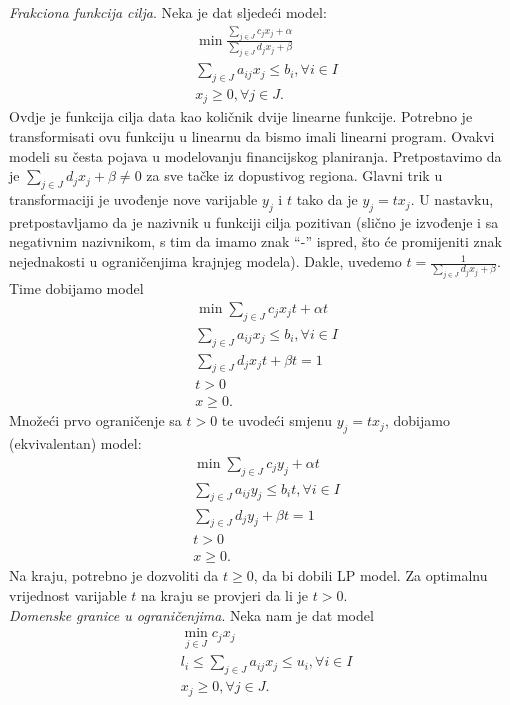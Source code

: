 \documentclass[a4paper, utf8, 11pt, colorlinks]{book}
\begin{document}
\emph{Frakciona funkcija cilja}. Neka je dat sljedeći model:
\begin{align*}
	& \min \frac{\sum_{j \in J} c_j x_j + \alpha}{ \sum_{j \in J} d_j x_j + \beta} \\
	& \sum_{j \in J} a_{ij} x_j \leq b_i,  \forall i \in I \\
	& x_j \geq 0, \forall j \in J.
\end{align*}
Ovdje je funkcija cilja data kao količnik dvije linearne funkcije. Potrebno je transformisati ovu funkciju u linearnu da bismo imali linearni program. Ovakvi modeli su česta pojava u modelovanju financijskog planiranja. Pretpostavimo da je $\sum_{j \in J}d_j x_j + \beta \neq 0$ za sve tačke iz dopustivog regiona. Glavni trik u transformaciji je uvođenje nove varijable $y_j$ i $t$ tako da je $y_j = t x_j$. U nastavku, pretpostavljamo da je nazivnik u funkciji cilja pozitivan (slično je izvođenje i sa negativnim nazivnikom, s tim da imamo znak ``-'' ispred, što će promijeniti znak nejednakosti u ograničenjima krajnjeg modela). Dakle, uvedemo $t = \frac{1}{\sum_{j \in J} d_j x_j + \beta }$. Time dobijamo model
\begin{align*}
	&\min \sum_{j \in J} c_j x_j t + \alpha t \\
	&\sum_{j \in J} a_{ij} x_j \leq b_i,  \forall i \in I \\
	& \sum_{j \in J} d_j x_j t + \beta t = 1 \\
	& t > 0 \\
	& x \geq 0.
\end{align*}
Množeći prvo ograničenje sa $t>0$ te uvodeći smjenu $y_j = t x_j$, dobijamo (ekvivalentan)  model:
\begin{align*}
	&\min \sum_{j \in J} c_j y_j + \alpha t \\
	& \sum_{j \in J} a_{ij} y_j \leq b_i t,  \forall i \in I \\
	& \sum_{j \in J} d_j y_j + \beta t = 1 \\
	& t > 0 \\
	& x \geq 0.
\end{align*}
Na kraju, potrebno je dozvoliti da $t \geq 0$, da bi dobili LP model. 
Za optimalnu vrijednost varijable $t$ na kraju se provjeri da li je $t>0$.   \\
\emph{Domenske granice u ograničenjima}. Neka nam je dat model
\begin{align*}
	&\min_{j \in J } c_j x_j \\
	& l_i \leq \sum_{j \in J} a_{ij} x_j \leq u_i, \forall i\in I \\
	& x_j \geq 0, \forall j \in J.
\end{align*} 
\end{document}
